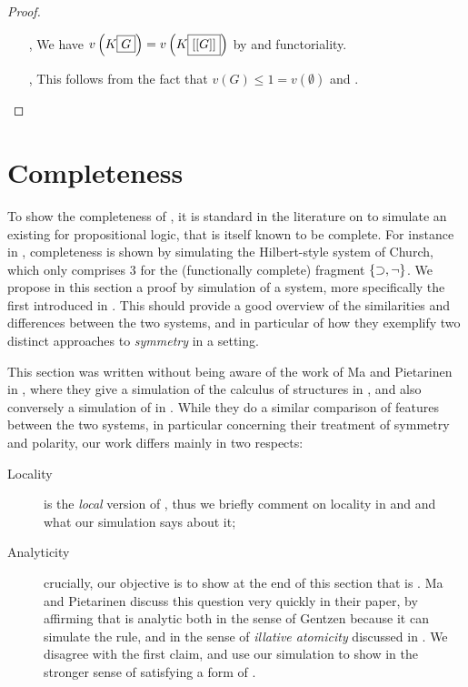 \begin{scope}
\begin{proof}
\begin{itemize}
    \item[\kl{Dcut{\da}}, \kl{Dcut{\ua}}] We have
    $v\left(K\fbox{$G$}\right) = v\left(K\fbox{$[[G]]$}\right)$ by
     and functoriality.

    \item[\kl{Ins}, \kl{Del}] This follows from the fact that $v(G) \leq 1 =
    v(\emptyset)$ and .
  \end{itemize}
\end{proof}

\section{Completeness}

To show the completeness of , it is standard in the literature on 
to simulate an existing  for  propositional logic, that is
itself known to be complete. For instance in \cite{Roberts+1973}, completeness
is shown by simulating the Hilbert-style system  of Church, which only
comprises 3  for the (functionally complete) fragment $\{\supset, \neg\}$.
We propose in this section a proof by simulation of a \emph{}
system, more specifically the   first introduced
in . This should provide a good overview of the
similarities and differences between the two systems, and in particular of how
they exemplify two distinct approaches to \emph{symmetry} in a 
setting.

\begin{kaonote}
  This section was written without being aware of the work of Ma and Pietarinen
  in , where they give a simulation of the calculus of
  structures  in , and also conversely a simulation of
   in . While they do a similar comparison of features
  between the two systems, in particular concerning their treatment of symmetry
  and polarity, our work differs mainly in two respects:
  \begin{description}
    \item[Locality]  is the \emph{local} version of , thus we
    briefly comment on locality in  and  and what our
    simulation says about it;
    \item[Analyticity] crucially, our objective is to show at the end of this
    section that  is \emph{}. Ma and Pietarinen discuss
    this question very quickly in their paper, by affirming that  is
    analytic both in the sense of Gentzen because it can simulate the 
    rule, and in the sense of \emph{illative atomicity} discussed in
    . We disagree with the first claim, and use our simulation
    to show  in the stronger sense of satisfying a form of
    .
  \end{description}
\end{kaonote}


\end{scope}
